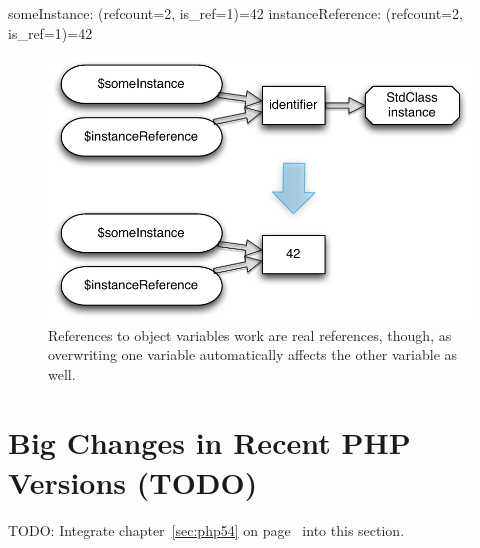 
\begin{textcode}
someInstance: (refcount=2, is_ref=1)=42
instanceReference: (refcount=2, is_ref=1)=42
\end{textcode}

\begin{figure}[htb]
  \begin{center}
    \includegraphics[scale=0.8]{images/someInstance_instanceReference}
    \caption{References to object variables work are real references, though, as overwriting one variable automatically affects the other variable as well.}
    \label{fig:real-object-references}
  \end{center}
\end{figure}


\section{Big Changes in Recent PHP Versions (TODO)}
TODO: Integrate chapter~\ref{sec:php54} on page~\pageref{sec:php54} into this section.

